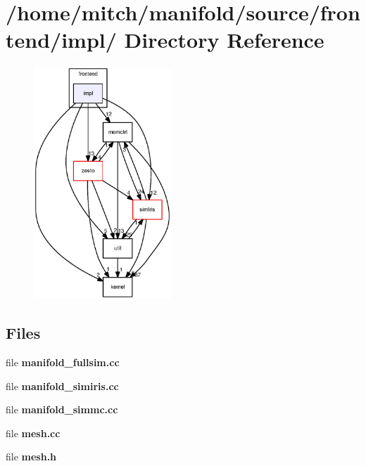 \section{/home/mitch/manifold/source/frontend/impl/ Directory Reference}
\label{dir_864a400db77e5a6deca9213450e2a25c}


\nopagebreak
\begin{figure}[H]
\begin{center}
\leavevmode
\includegraphics[width=146pt]{dir_864a400db77e5a6deca9213450e2a25c_dep}
\end{center}
\end{figure}
\subsection*{Files}
\begin{CompactItemize}
\item 
file {\bf manifold\_\-fullsim.cc}
\item 
file {\bf manifold\_\-simiris.cc}
\item 
file {\bf manifold\_\-simmc.cc}
\item 
file {\bf mesh.cc}
\item 
file {\bf mesh.h}
\end{CompactItemize}

